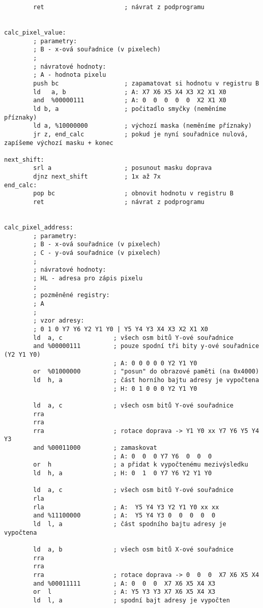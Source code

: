 \documentclass{article}
\begin{document}
\begin{verbatim}
        ret                      ; návrat z podprogramu
 
 
calc_pixel_value:
        ; parametry:
        ; B - x-ová souřadnice (v pixelech)
        ;
        ; návratové hodnoty:
        ; A - hodnota pixelu
        push bc                  ; zapamatovat si hodnotu v registru B
        ld   a, b                ; A: X7 X6 X5 X4 X3 X2 X1 X0 
        and  %00000111           ; A: 0  0  0  0  0  X2 X1 X0
        ld b, a                  ; počitadlo smyčky (neměníme příznaky)
        ld a, %10000000          ; výchozí maska (neměníme příznaky)
        jr z, end_calc           ; pokud je nyní souřadnice nulová, zapíšeme výchozí masku + konec
 
next_shift:
        srl a                    ; posunout masku doprava
        djnz next_shift          ; 1x až 7x
end_calc:
        pop bc                   ; obnovit hodnotu v registru B
        ret                      ; návrat z podprogramu
 
 
calc_pixel_address:
        ; parametry:
        ; B - x-ová souřadnice (v pixelech)
        ; C - y-ová souřadnice (v pixelech)
        ;
        ; návratové hodnoty:
        ; HL - adresa pro zápis pixelu
        ;
        ; pozměněné registry:
        ; A
        ;
        ; vzor adresy:
        ; 0 1 0 Y7 Y6 Y2 Y1 Y0 | Y5 Y4 Y3 X4 X3 X2 X1 X0
        ld  a, c              ; všech osm bitů Y-ové souřadnice
        and %00000111         ; pouze spodní tři bity y-ové souřadnice (Y2 Y1 Y0)
                              ; A: 0 0 0 0 0 Y2 Y1 Y0
        or  %01000000         ; "posun" do obrazové paměti (na 0x4000)
        ld  h, a              ; část horního bajtu adresy je vypočtena
                              ; H: 0 1 0 0 0 Y2 Y1 Y0
 
        ld  a, c              ; všech osm bitů Y-ové souřadnice
        rra
        rra
        rra                   ; rotace doprava -> Y1 Y0 xx Y7 Y6 Y5 Y4 Y3
        and %00011000         ; zamaskovat
                              ; A: 0  0  0 Y7 Y6  0  0  0
        or  h                 ; a přidat k vypočtenému mezivýsledku
        ld  h, a              ; H: 0  1  0 Y7 Y6 Y2 Y1 Y0
 
        ld  a, c              ; všech osm bitů Y-ové souřadnice
        rla
        rla                   ; A:  Y5 Y4 Y3 Y2 Y1 Y0 xx xx
        and %11100000         ; A:  Y5 Y4 Y3 0  0  0  0  0
        ld  l, a              ; část spodního bajtu adresy je vypočtena
 
        ld  a, b              ; všech osm bitů X-ové souřadnice
        rra
        rra
        rra                   ; rotace doprava -> 0  0  0  X7 X6 X5 X4
        and %00011111         ; A: 0  0  0  X7 X6 X5 X4 X3
        or  l                 ; A: Y5 Y3 Y3 X7 X6 X5 X4 X3
        ld  l, a              ; spodní bajt adresy je vypočten

\end{verbatim}
\end{document}
